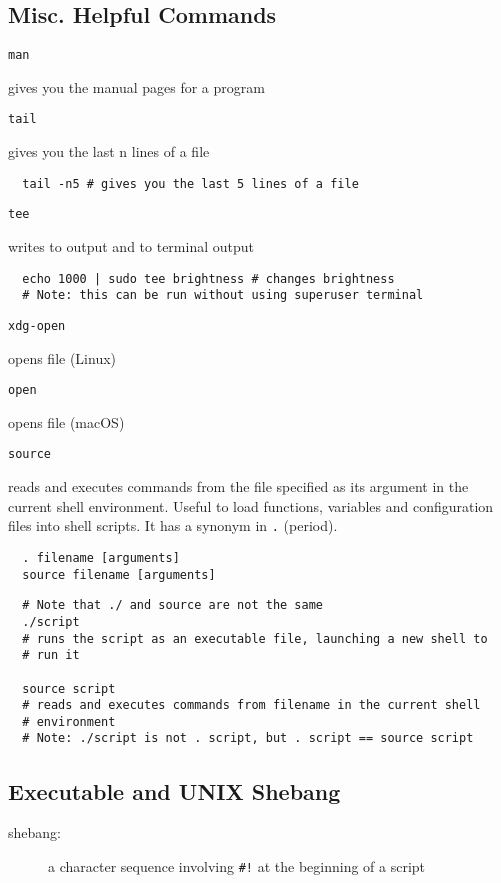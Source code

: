 \documentclass[letterpaper,12pt]{article}
\newcommand*{\lstitem}[1]{
  \setbox0\hbox{\lstinline{#1}}
  \item[\usebox0]
}
\begin{document}
\subsection{Misc. Helpful Commands}

\begin{description}
 \lstitem{man} gives you the manual pages for a program
 \lstitem{tail} gives you the last n lines of a file
\end{description}

\begin{lstlisting}
  tail -n5 # gives you the last 5 lines of a file
\end{lstlisting}

\begin{description}
 \lstitem{tee} writes to output and to terminal output
\end{description}

\begin{lstlisting}
  echo 1000 | sudo tee brightness # changes brightness
  # Note: this can be run without using superuser terminal
\end{lstlisting}

\begin{description}
 \lstitem{xdg-open} opens file (Linux)
 \lstitem{open} opens file (macOS)
\end{description}

\begin{description}
  \lstitem{source} reads and executes commands from the file specified as its argument in the current shell environment. Useful to load functions, variables and configuration files into shell scripts. It has a synonym in \lstinline{.} (period).
\end{description}

\begin{lstlisting}
  . filename [arguments]
  source filename [arguments]
\end{lstlisting}

\begin{lstlisting}
  # Note that ./ and source are not the same
  ./script
  # runs the script as an executable file, launching a new shell to
  # run it

  source script
  # reads and executes commands from filename in the current shell
  # environment
  # Note: ./script is not . script, but . script == source script
\end{lstlisting}

\subsection{Executable and UNIX Shebang}
\begin{description}
 \item[shebang: ] a character sequence involving \lstinline{#!} at the beginning of a script
\end{description}
\end{document}

